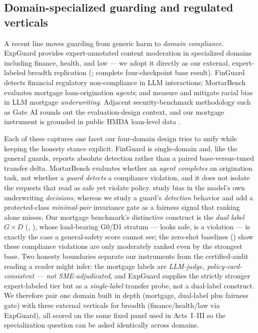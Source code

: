 \subsection{Domain-specialized guarding and regulated verticals}
\label{sec:related-domain}
A recent line moves guarding from generic harm to \emph{domain compliance}. ExpGuard
\citep{expguard2026} provides expert-annotated content moderation in specialized domains including
finance, health, and law --- we adopt it directly as our external, expert-labeled breadth replication
(; complete four-checkpoint base result). FinGuard
\citep{dou2026finguard} detects financial regulatory non-compliance in LLM interactions; MortarBench
\citep{toles2026mortarbench} evaluates mortgage loan-origination \emph{agents}; and
\citet{bowen2024mortgage} measure and mitigate racial bias in LLM mortgage \emph{underwriting}.
Adjacent security-benchmark methodology such as Gate AI \citep{goehausen2026gateai} rounds out the
evaluation-design context, and our mortgage instrument is grounded in public HMDA loan-level data
\citep{hmda2022}.

Each of these captures one facet our four-domain design tries to unify while keeping the honesty stance
explicit. FinGuard is single-domain and, like the general guards, reports absolute detection rather than
a paired base-versus-tuned transfer delta. MortarBench evaluates whether an \emph{agent completes} an
origination task, not whether a \emph{guard detects} a compliance violation, and it does not isolate the
requests that read as safe yet violate policy. \citet{bowen2024mortgage} study bias in the model's own
underwriting \emph{decisions}, whereas we study a guard's \emph{detection} behavior and add a
protected-class \emph{minimal-pair} invariance gate as a fairness signal that ranking alone misses. Our
mortgage benchmark's distinctive construct is the \emph{dual label} $G\times D$ (,
), whose load-bearing G0/D1 stratum --- looks safe, is a violation --- is exactly the
case a general-safety score cannot see; the zero-shot baselines () show these
compliance violations are only moderately ranked even by the strongest base. Two honesty boundaries
separate our instruments from the certified-audit reading a reader might infer: the mortgage labels are
\emph{LLM-judge, policy-card-consistent --- not SME-adjudicated}, and ExpGuard supplies the strictly
stronger expert-labeled tier but as a \emph{single-label} transfer probe, not a dual-label construct. We
therefore pair one domain built in depth (mortgage, dual-label plus fairness gate) with three external
verticals for breadth (finance/health/law via ExpGuard), all scored on the same fixed panel used in
Acts~I--III so the specialization question can be asked identically across domains.

